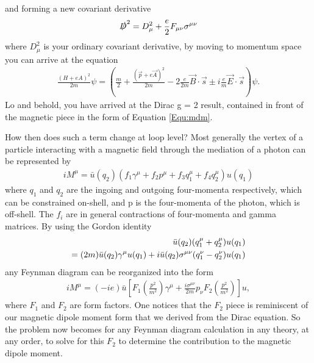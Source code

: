 and forming a new covariant derivative
\begin{align}
\slashed{D}^{2} = D_{\mu}^{2} + \frac{e}{2} F_{\mu\nu}\sigma^{\mu\nu}
\end{align}
where $D_{\mu}^{2}$ is your ordinary covariant derivative, by moving to momentum space you can arrive at the equation
\begin{align}
\frac{(H+eA)^2}{2m}\psi = (\frac{m}{2} + \frac{(\vec{p}+e\vec{A})^{2}}{2m} -2 \frac{e}{2m}\vec{B}\cdot\vec{s} \pm i \frac{e}{m}\vec{E}\cdot\vec{s})\psi.
\end{align}
Lo and behold, you have arrived at the Dirac g = 2 result, contained in front of the magnetic piece in the form of Equation \ref{Equ:mdm}.

How then does such a term change at loop level? Most generally the vertex of a particle interacting with a magnetic field through the mediation of a photon can be represented by 
\begin{align}
iM^{\mu} = \bar{u}(q_{2}) (f_{1}\gamma^{\mu} + f_{2}p^{\mu} + f_{3}q^{\mu}_{1} + f_{4}q^{\mu}_{2}) u(q_{1})
\end{align}
where $q_{1}$ and $q_{2}$ are the ingoing and outgoing four-momenta respectively, which can be constrained on-shell, and p is the four-momenta of the photon, which is off-shell. The $f_{i}$ are in general contractions of four-momenta and gamma matrices. By using the Gordon identity
\begin{align}
\bar{u}(q_{2}) (q^{\mu}_{1} + q^{\mu}_{2}) u(q_{1}) \notag \\
= (2m)\bar{u}(q_{2}) \gamma^{\mu}u(q_{1}) + i\bar{u}(q_{2})\sigma^{\mu\nu}(q^{\nu}_{1} - q^{\nu}_{2}) u(q_{1})
\end{align}
any Feynman diagram can be reorganized into the form 
\begin{align}
iM^{\mu} = (-ie)\bar{u}[F_{1}(\frac{p^{2}}{m^2})\gamma^{\mu} + \frac{i\sigma^{\mu\nu}}{2m} p_{\nu}F_{2}(\frac{p^{2}}{m^2})]u,
\end{align}
where $F_{1}$ and $F_{2}$ are form factors. One notices that the $F_{2}$ piece is reminiscent of our magnetic dipole moment form that we derived from the Dirac equation. So the problem now becomes for any Feynman diagram calculation in any theory, at any order, to solve for this $F_{2}$ to determine the contribution to the magnetic dipole moment.
